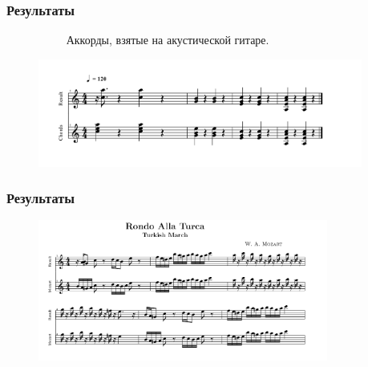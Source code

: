 \documentclass[11pt,slides,aspectratio=43]{beamer}%
\begin{document}
    \begin{frame}
    \frametitle{Результаты}
               ~~~~~~~~~~ Аккорды, взятые на акустической гитаре.
	   \begin{figure}[h!]
            \begin{center}
                \includegraphics[width = 0.95\textwidth]{Am_chords_-_compare-001.png}

            \end{center}

        \end{figure}
	\end{frame}

    \begin{frame}
	\frametitle{Результаты}
	   \begin{figure}[h!]
            \begin{center}
                \includegraphics[width = 0.85\textwidth]{turca.png}
            \end{center}

        \end{figure}
	\end{frame}
\end{document}
